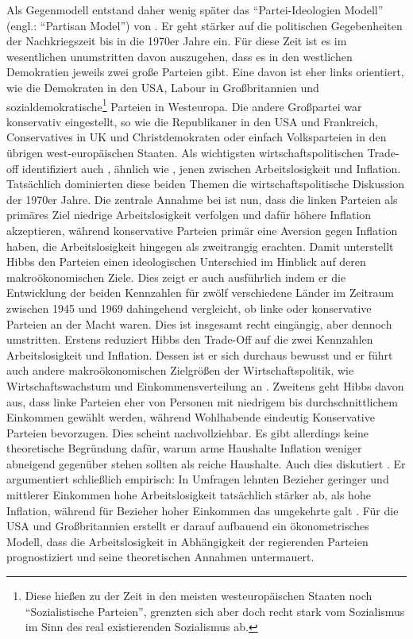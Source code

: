 Als Gegenmodell entstand daher wenig später das "`Partei-Ideologien Modell"' (engl.: "`Partisan Model"') von \textcite{Hibbs1977}. Er geht stärker auf die politischen Gegebenheiten der Nachkriegszeit bis in die 1970er Jahre ein. Für diese Zeit ist es im wesentlichen unumstritten davon auszugehen, dass es in den westlichen Demokratien jeweils zwei große Parteien gibt. Eine davon ist eher links orientiert, wie die Demokraten in den USA, Labour in Großbritannien und sozialdemokratische\footnote{Diese hießen zu der Zeit in den meisten westeuropäischen Staaten noch "`Sozialistische Parteien"', grenzten sich aber doch recht stark vom Sozialismus im Sinn des real existierenden Sozialismus ab.} Parteien in Westeuropa. Die andere Großpartei war konservativ eingestellt, so wie die Republikaner in den USA und Frankreich, Conservatives in UK und  Christdemokraten oder einfach Volksparteien in den übrigen west-europäischen Staaten. Als wichtigsten wirtschaftspolitischen Trade-off identifiziert auch \textcite{Hibbs1977}, ähnlich wie \textcite{Nordhaus1975}, jenen zwischen Arbeitslosigkeit und Inflation. Tatsächlich dominierten diese beiden Themen die wirtschaftspolitische Diskussion der 1970er Jahre. Die zentrale Annahme bei \textcite[S. 1468]{Hibbs1977} ist nun, dass die linken Parteien als primäres Ziel niedrige Arbeitslosigkeit verfolgen und dafür höhere Inflation akzeptieren, während konservative Parteien primär eine Aversion gegen Inflation haben, die Arbeitslosigkeit hingegen als zweitrangig erachten. Damit unterstellt Hibbs den Parteien einen ideologischen Unterschied im Hinblick auf deren makroökonomischen Ziele. Dies zeigt er auch ausführlich indem er die Entwicklung der beiden Kennzahlen für zwölf verschiedene Länder im Zeitraum zwischen 1945 und 1969 dahingehend vergleicht, ob linke oder konservative Parteien an der Macht waren. Dies ist insgesamt recht eingängig, aber dennoch umstritten. Erstens reduziert Hibbs den Trade-Off auf die zwei Kennzahlen Arbeitslosigkeit und Inflation. Dessen ist er sich durchaus bewusst und er führt auch andere makroökonomischen Zielgrößen der Wirtschaftspolitik, wie Wirtschaftswachstum und Einkommensverteilung an \parencite[S. 1471]{Hibbs1977}. Zweitens geht Hibbs davon aus, dass linke Parteien eher von Personen mit niedrigem bis durchschnittlichem Einkommen gewählt werden, während Wohlhabende eindeutig Konservative Parteien bevorzugen. Dies scheint nachvollziehbar. Es gibt allerdings keine theoretische Begründung dafür, warum arme Haushalte Inflation weniger abneigend gegenüber stehen sollten als reiche Haushalte. Auch dies diskutiert \textcite[S. 1470]{Hibbs1977}. Er argumentiert schließlich empirisch: In Umfragen lehnten Bezieher geringer und mittlerer Einkommen hohe Arbeitslosigkeit tatsächlich stärker ab, als hohe Inflation, während für Bezieher hoher Einkommen das umgekehrte galt \parencite[S. 1470]{Hibbs1977}. Für die USA und Großbritannien erstellt er darauf aufbauend ein ökonometrisches Modell, dass die Arbeitslosigkeit in Abhängigkeit der regierenden Parteien prognostiziert und seine theoretischen Annahmen untermauert.

